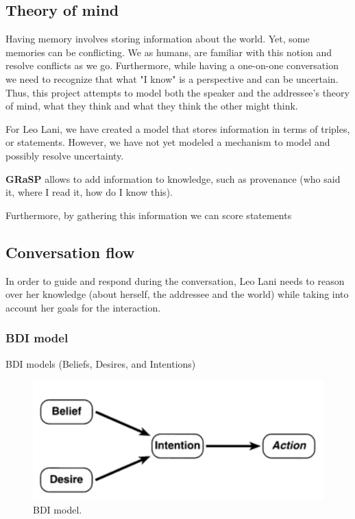 \documentclass[a4paper]{article}
\begin{document}
\subsection{Theory of mind}
Having memory involves storing information about the world. Yet, some memories can be conflicting. We as humans, are familiar with this notion and resolve conflicts as we go. Furthermore, while having a one-on-one conversation we need to recognize that what "I know" is a perspective and can be uncertain. Thus, this project attempts to model both the speaker and the addressee's theory of mind, what they think and what they think the other might think. 

For Leo Lani, we have created a model that stores information in terms of triples, or statements. However, we have not yet modeled a mechanism to model and possibly resolve uncertainty. 

\textbf{GRaSP} allows to add information to knowledge, such as provenance (who said it, where I read it, how do I know this). 

Furthermore, by gathering this information we can score statements 

\subsection{Conversation flow}
In order to guide and respond during the conversation, Leo Lani needs to reason over her knowledge (about herself, the addressee and the world) while taking into account her goals for the interaction. 

\subsubsection{BDI model}
BDI models (Beliefs, Desires, and Intentions)

\begin{figure}[h]
  \includegraphics[width=\linewidth]{images/BDI.png}
  \caption{BDI model.}
  \label{fig:BDI model}
\end{figure}
\end{document}
